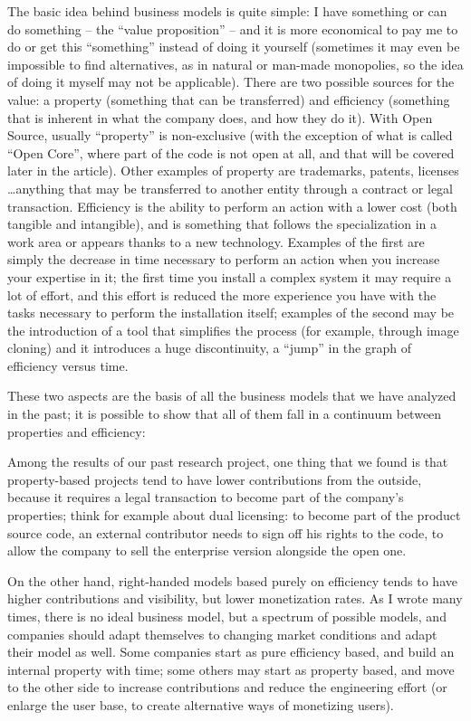 The basic idea behind business models is quite simple: I have something or can
do something -- the ``value proposition'' -- and it is more economical to pay me to do or get this ``something'' instead of doing it yourself (sometimes it may even be impossible to find alternatives, as in natural or man-made monopolies, so the idea of doing it myself may not be applicable). 
There are two possible sources for the value: a property (something that can be
transferred) and efficiency (something that is inherent in what the company does, and how they do it). With Open Source, usually ``property'' is non-exclusive (with the exception of what is called ``Open Core'', where part of the code is not open at all, and that will be covered later in the article). Other examples of property are trademarks, patents, licenses \dots anything that may be transferred to another entity through a contract or legal transaction.
Efficiency is the ability to perform an action with a lower cost (both tangible
and intangible), and is something that follows the specialization in a work area
or appears thanks to a new technology. Examples of the first are simply the
decrease in time necessary to perform an action when you increase your expertise
in it; the first time you install a complex system it may require a lot of effort, and this effort is reduced the more experience you have with the tasks necessary to perform the installation itself; examples of the second may be the introduction of a tool that simplifies the process (for example, through image cloning) and it introduces a huge discontinuity, a ``jump'' in the graph of efficiency versus time.

These two aspects are the basis of all the business models that we have analyzed
in the past; it is possible to show that all of them fall in a continuum between
properties and efficiency:

Among the results of our past research project, one thing that we found is that
property-based projects tend to have lower contributions from the outside,
because it requires a legal transaction to become part of the company’s
properties; think for example about dual licensing: to become part of the product source code, an external contributor needs to sign off his rights to the code, to allow the company to sell the enterprise version alongside the open one. 

On the other hand, right-handed models based purely on efficiency tends to have
higher contributions and visibility, but lower monetization rates. As I wrote
many times, there is no ideal business model, but a spectrum of possible models,
and companies should adapt themselves to changing market conditions and adapt
their model as well. Some companies start as pure efficiency based, and build an
internal property with time; some others may start as property based, and move
to the other side to increase contributions and reduce the engineering effort
(or enlarge the user base, to create alternative ways of monetizing users).

